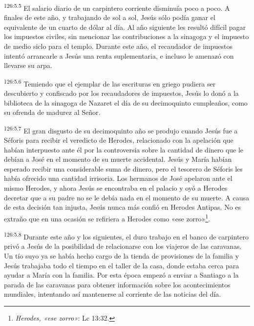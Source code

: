 \par
\textsuperscript{126:5.5} El salario diario de un carpintero corriente disminuía poco a poco. A finales de este año, y trabajando de sol a sol, Jesús sólo podía ganar el equivalente de un cuarto de dólar al día. Al año siguiente les resultó difícil pagar los impuestos civiles, sin mencionar las contribuciones a la sinagoga y el impuesto de medio siclo para el templo. Durante este año, el recaudador de impuestos intentó arrancarle a Jesús una renta suplementaria, e incluso le amenazó con llevarse su arpa.

\par
\textsuperscript{126:5.6} Temiendo que el ejemplar de las escrituras en griego pudiera ser descubierto y confiscado por los recaudadores de impuestos, Jesús lo donó a la biblioteca de la sinagoga de Nazaret el día de su decimoquinto cumpleaños, como su ofrenda de madurez al Señor.

\par
\textsuperscript{126:5.7} El gran disgusto de su decimoquinto año se produjo cuando Jesús fue a Séforis para recibir el veredicto de Herodes, relacionado con la apelación que habían interpuesto ante él por la controversia sobre la cantidad de dinero que le debían a José en el momento de su muerte accidental. Jesús y María habían esperado recibir una considerable suma de dinero, pero el tesorero de Séforis les había ofrecido una cantidad irrisoria. Los hermanos de José apelaron ante el mismo Herodes, y ahora Jesús se encontraba en el palacio y oyó a Herodes decretar que a su padre no se le debía nada en el momento de su muerte. A causa de esta decisión tan injusta, Jesús nunca más confió en Herodes Antipas. No es extraño que en una ocasión se refiriera a Herodes como «ese zorro»\footnote{\textit{Herodes, «ese zorro»}: Lc 13:32.}.

\par
\textsuperscript{126:5.8} Durante este año y los siguientes, el duro trabajo en el banco de carpintero privó a Jesús de la posibilidad de relacionarse con los viajeros de las caravanas. Un tío suyo ya se había hecho cargo de la tienda de provisiones de la familia y Jesús trabajaba todo el tiempo en el taller de la casa, donde estaba cerca para ayudar a María con la familia. Por esta época empezó a enviar a Santiago a la parada de las caravanas para obtener información sobre los acontecimientos mundiales, intentando así mantenerse al corriente de las noticias del día.

